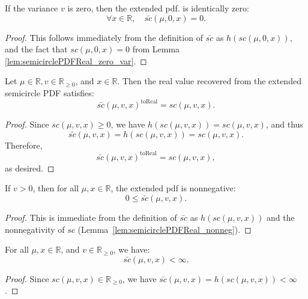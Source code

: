 \begin{lemma}
  \leanok
  \label{lem:semicirclePDF_zero_var}
  If the variance $v$ is zero, then the extended pdf. is identically zero:
 $$ 
    \forall x \in \mathbb{R}, \quad \bar{sc}(\mu,0,x) = 0.
 $$ 
\end{lemma}
\begin{proof}
    This follows immediately from the definition of $\bar{sc}$ as $h(sc(\mu,0,x))$, and the fact that $sc(\mu,0,x) = 0$ from Lemma \ref{lem:semicirclePDFReal_zero_var}.
\end{proof}

\begin{lemma}
    \leanok
    \label{lem:toReal_semicirclePDF}
    Let $ \mu \in \mathbb{R} ,  v \in \mathbb{R}_{\ge 0}$, and $x \in \mathbb{R} $.
Then the real value recovered from the extended semicircle PDF satisfies:
\[
    \bar{sc}(\mu, v, x)^{\operatorname{toReal}} = sc(\mu, v, x).
\]
\end{lemma}
\begin{proof}
Since $sc(\mu, v, x) \ge 0$, we have $h(sc(\mu, v, x)) = sc(\mu, v, x)$, and thus
\[
    \bar{sc}(\mu, v, x) = h(sc(\mu, v, x)) = sc(\mu, v, x).
\]
Therefore,
\[
    \bar{sc}(\mu, v, x)^{\operatorname{toReal}} = sc(\mu, v, x),
\]
as desired.
\end{proof}

\begin{lemma}
  \leanok
  \label{lem:semicirclePDF_nonneg}
  If $v > 0$, then for all $\mu, x \in \mathbb{R}$, the extended pdf is nonnegative:
  \[
      0 \le \bar{sc}(\mu,v,x).
  \]
\end{lemma}
\begin{proof}
    This is immediate from the definition of $\bar{sc}$ as $h(sc(\mu,v,x))$ and the nonnegativity of $sc$ (Lemma~\ref{lem:semicirclePDFReal_nonneg}).
\end{proof}

\begin{lemma}
  \leanok
  \label{lem:semicirclePDF_finite}
  For all $\mu, x \in \mathbb{R}$, and $v \in \mathbb{R}_{\ge 0}$, we have:
    $$ 
    \bar{sc}(\mu,v,x) < \infty.
    $$ 
\end{lemma}
\begin{proof}
Since $sc(\mu,v,x) \in \mathbb{R}_{\ge 0}$, we have $\bar{sc}(\mu,v,x) = h(sc(\mu,v,x)) < \infty$.
\end{proof}

